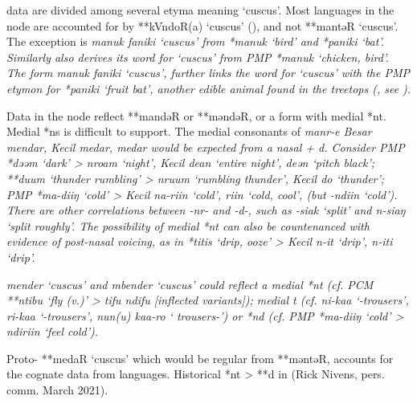  data are divided among several etyma meaning ‘cuscus’.
Most languages in the  node are accounted for
by **kVndoR(a) ‘cuscus’ (),
and not **mantəR ‘cuscus’.
The exception is  \it{manuk faniki} `cuscus' from *manuk `bird' and *paniki `bat'.
Similarly   also derives
its word for ‘cuscus’ from PMP *manuk ‘chicken, bird’.
The  form \it{manuk faniki} ‘cuscus’,
further links the word for ‘cuscus’ with the PMP etymon for
*paniki ‘fruit bat’, another edible animal found in the treetops
(\citealp[269f]{Schapper2011}, see ).

Data in the  node reflect **mandəR or
**məndəR, or a form with medial *nt.
Medial *ns is difficult to support.
The medial consonants of  \it{manr-e}  Besar \it{mendar},
 Kecil \it{medar},  \it{medar} would be expected from
a nasal + \it{d}.
Consider PMP *dəəm ‘dark’ >  \it{nroam}
‘night’,  Kecil \it{dean} ‘entire night’,
 \it{deən} ‘pitch black’; **duum ‘thunder
rumbling’ >  \it{nruum} ‘rumbling thunder’,
 Kecil \it{do} ‘thunder’; PMP *ma-diiŋ ‘cold’
>  Kecil \it{na-riin} ‘cold’,
 \it{riin} ‘cold, cool’,
(but  \it{-ndiin} ‘cold’).
There are other correlations between  \mbox{\it{-nr-}}
and  \it{-d-}, such as  \it{-siak} ‘split’
and  \it{n-siaŋ} ‘split roughly’.
The possibility of medial *nt can also be countenanced with evidence
of post-nasal voicing, as in *titis ‘drip,
ooze’ >  Kecil \it{n-it} ‘drip’,  \it{n-iti} ‘drip’.

 \it{mender} ‘cuscus’ \citep[196]{Ellen1993}
and \it{mbender} ‘cuscus’ \citep[45]{Kakerissa1986} could reflect a medial *nt (cf.
PCM **ntibu ‘fly (v.)’ >  \it{tifu {\tl} ndifu} [inflected
variants]); medial \it{t} (cf.
 \it{ni-kaa} ‘-trousers’,  \it{ri-kaa}
‘-trousers’,  \it{nun(u) kaa-ro} ‘ trousers-’) or *nd (cf.
PMP *ma-diiŋ ‘cold’ >  \it{ndiriin} ‘feel cold’).

Proto- **medaR ‘cuscus’ \citep[264]{Schapper2011} which would
be regular from **məntəR,
accounts for the cognate data from  languages.
Historical *nt > **d in  (Rick Nivens, pers. comm. March 2021).


